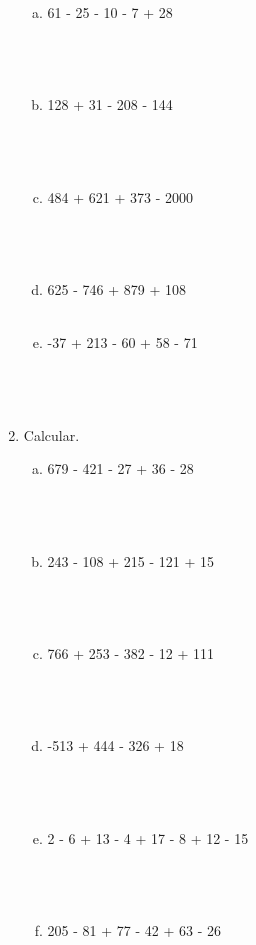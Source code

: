 \documentclass[a4paper,14pt]{article}
\begin{document}
\begin{multicols}{2}
\begin{enumerate}
\begin{enumerate}[a)]
    				\item 61 - 25 - 10 - 7 + 28 \\\\\\\\
    				\item 128 + 31 - 208 - 144 \\\\\\\\
    				\item 484 + 621 + 373 - 2000 \\\\\\\\
    				\item 625 - 746 + 879 + 108 \\\\
    				\item -37 + 213 - 60 + 58 - 71 \\\\\\\\
    			\end{enumerate}
    			\item Calcular.
    			\begin{enumerate}[a)]
    				\item 679 - 421 - 27 + 36 - 28 \\\\\\\\
    				\item 243 - 108 + 215 - 121 + 15 \\\\\\\\
    				\item 766 + 253 - 382 - 12 + 111 \\\\\\\\
    				\item -513 + 444 - 326 + 18 \\\\\\\\
    				\item 2 - 6 + 13 - 4 + 17 - 8 + 12 - 15 \\\\\\\\
    				\item 205 - 81 + 77 - 42 + 63 - 26 \\\\\\\\

\end{enumerate}
\end{enumerate}
\end{multicols}
\end{document}
